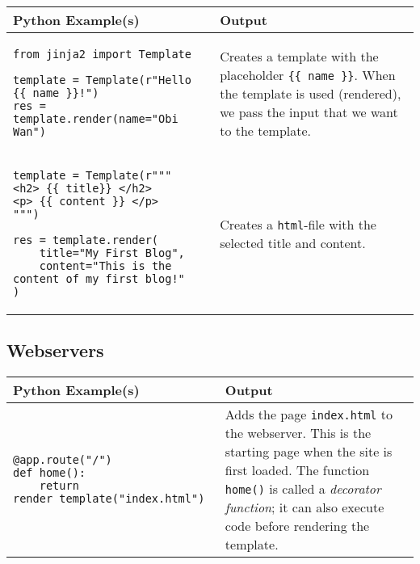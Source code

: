 \documentclass[11pt,a4paper]{report}
\begin{document}
\begin{longtable}{|p{}|p{}|}
\hline
Python  Example(s) & Output  \\
\hline 
\endhead
 \begin{lstlisting}
from jinja2 import Template

template = Template(r"Hello {{ name }}!")
res = template.render(name="Obi Wan")
\end{lstlisting}  & Creates a template with the placeholder \verb|{{ name }}|. When the template is used (rendered), we pass the input that we want to the template. \\
\hline
\begin{lstlisting}
template = Template(r"""
<h2> {{ title}} </h2>
<p> {{ content }} </p>
""")

res = template.render(
    title="My First Blog",
    content="This is the content of my first blog!"
)
\end{lstlisting} &
Creates a \verb|html|-file with the selected title and content. \\
\hline

\end{longtable}

\newpage
\subsection{Webservers}

\begin{longtable}{|p{}|p{}|}
\hline
Python  Example(s) & Output  \\
\hline 
\endhead
 \begin{lstlisting}
@app.route("/")
def home():
    return render_template("index.html")
\end{lstlisting}  & Adds the page \verb|index.html| to the webserver. This is the starting page when the site is first loaded. The function \verb|home()| is called a \emph{decorator function}; it can also execute code before rendering the template. \\
\hline


\end{longtable}

\newpage
\end{document}
